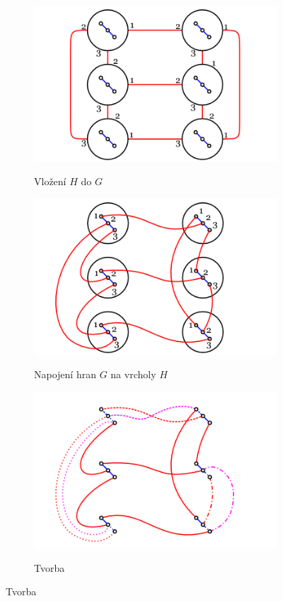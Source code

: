 \begin{figure}
\centering
\begin{subfigure}{7.5cm}{\includegraphics[width=\textwidth]{img/zigzag1.png}}\caption{Vložení 
$H$ do $G$}\end{subfigure}
\begin{subfigure}{7.5cm}{\includegraphics[width=\textwidth]{img/zigzag2.png}}\caption{Napojení 
hran $G$ na vrcholy $H$}\end{subfigure}
\begin{subfigure}{7.5cm}{\includegraphics[width=\textwidth]{img/zigzag3.png}}\caption{Tvorba 
}
\end{subfigure}
\end{figure}
